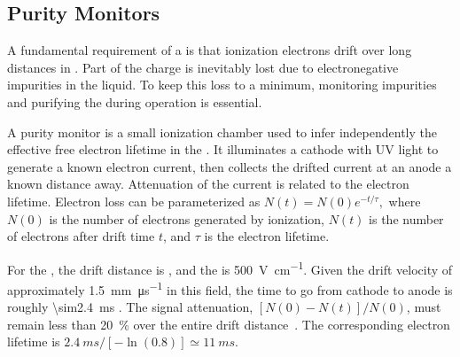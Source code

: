 

\subsection{Purity Monitors}
\label{sec:fdgen-slow-cryo-purity-mon}

A fundamental requirement of a   is that ionization electrons drift over long distances in . Part of the charge is inevitably lost due to electronegative impurities in the liquid. To keep this loss to a minimum, monitoring impurities and purifying the  during operation is essential.




A purity monitor is a small ionization chamber used to infer independently  the effective free electron lifetime in the \lartpc.  %
It illuminates a cathode with UV light to generate a known electron current, then collects the drifted current at an anode a known distance away.  Attenuation of the current is related to the electron lifetime.
Electron loss can be parameterized as
%
\(N(t) = N(0)e^{-t/\tau},\)
%
where $N(0)$ is the number of electrons generated by ionization, $N(t)$ is the number of electrons after drift time $t$, and $\tau$ is the electron lifetime. 


For the , the drift distance is \spmaxdrift, and the \efield is \SI{500}{\volt\per\centi\meter}. Given the drift velocity of approximately \SI{1.5}{\milli\meter\per\micro\second} in this field, the time to go from cathode to anode is roughly \SI{\sim2.4}{\milli\second} \cite{Walkowiak:2000wf}.
The \lar {} signal attenuation, \([N(0)-N(t)]/N(0)\), must remain %
less than \SI{20}{\percent} over the entire drift distance~\cite{bib:docdb3384}.  %
 The corresponding electron lifetime is $\SI{2.4}{ms}/[-\ln(0.8)] \simeq \SI{11}{ms}$.

